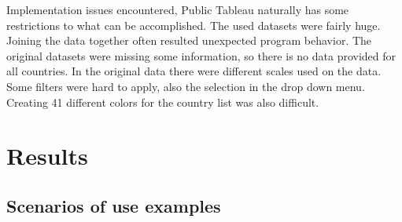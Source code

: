 \documentclass{vgtc}                          %
\begin{document}
Implementation issues encountered, Public Tableau naturally has some restrictions to what can be accomplished.
The used datasets were fairly huge. Joining the data together often resulted unexpected program behavior. The original datasets were missing some information, so there is no data provided for all countries. In the original data there were different scales used on the data. Some filters were hard to apply, also the selection in the drop down menu.
Creating 41 different colors for the country list was also difficult.

\section{Results}

\subsection{Scenarios of use examples}
\end{document}
